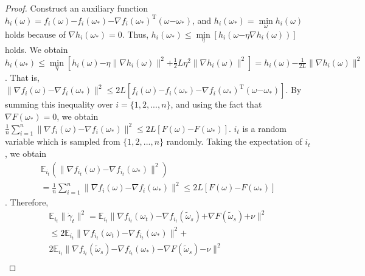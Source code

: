 \documentclass[letterpaper]{article}
\begin{document}
\begin{proof}
Construct an auxiliary function $h_i(\omega)=f_i(\omega)\mathrm{-}f_i(\omega_\ast)\mathrm{-}\nabla f_i(\omega_\ast)^\mathrm{T}(\omega\mathrm{-}\omega_\ast)$, and $h_i(\omega_\ast)=\min\limits_\omega h_i(\omega)$ holds because of $\nabla h_i(\omega_\ast)=0$. Thus, $h_i(\omega_\ast)\le \min\limits_\eta [h_i(\omega\mathrm{-}\eta \nabla h_i(\omega))]$ holds. We obtain
$h_i(\omega_\ast)\le\min\limits_\eta [h_i(\omega)\mathrm{-}\eta \parallel \nabla h_i(\omega) \parallel^2\mathrm{+}\frac{1}{2} L \eta^2 \parallel  \nabla h_i(\omega)  \parallel^2  ] 
=h_i(\omega)\mathrm{-}\frac{1}{2L}\parallel  \nabla h_i(\omega) \parallel^2$.  That is, 
$\parallel   \nabla f_i(\omega)  \mathrm{-} \nabla f_i(\omega_\ast)   \parallel^2 \le 2L [ f_i(\omega)  \mathrm{-}  f_i(\omega_\ast)  \mathrm{-}\nabla f_i(\omega_\ast)^{\mathrm{T}}(\omega\mathrm{-}\omega_\ast)  ]$. By summing this inequality over $i=\{1,2, ..., n\}$, and using the fact that $\nabla F(\omega_\ast)=0$, we obtain $
\frac{1}{n} \sum\limits_{i=1}^n \parallel  \nabla f_i(\omega)  \mathrm{-} \nabla f_i(\omega_\ast)  \parallel^2  \mathrm{\le}   2L [F(\omega)\mathrm{-}F(\omega_\ast)] $. $i_t$ is a random variable which is sampled from $\{1,2, ...,n\}$ randomly. Taking the expectation of $i_t$, we obtain 
\begin{equation}\label{equa_1}
\begin{array}{ll}
\mathbb{E}_{i_t}(\parallel  \nabla f_{i_{t}}(\omega) \mathrm{-} \nabla f_{i_{t}}(\omega_{\ast}) \parallel^2) \\
= \frac{1}{n} \sum\limits_{i=1}^n \parallel  \nabla f_i(\omega) \mathrm{-} \nabla f_i(\omega_\ast)  \parallel^2 \le 2L [F(\omega)\mathrm{-}F(\omega_\ast)] 
\end{array} 
\end{equation}.  Therefore,
\begin{equation}\label{equa_2}
\begin{array}{ll}
\mathbb{E}_{i_t}\parallel  \dot{\gamma}_{t} \parallel^2  
= \mathbb{E}_{i_t} \parallel \nabla f_{i_{t}}(\omega_{t}) \mathrm{-} \nabla f_{i_{t}}(\tilde{\omega}_s)  \mathrm{+} \nabla F(\tilde{\omega}_s) \mathrm{+} \nu \parallel^2\\
\le 2\mathbb{E}_{i_t} \parallel \nabla f_{i_{t}}(\omega_{t}) \mathrm{-} \nabla f_{i_{t}}(\omega_{\ast}) \parallel^2 \mathrm{+}\\
 2 \mathbb{E}_{i_t} \parallel  \nabla f_{i_{t}}(\tilde{\omega}_{s}) \mathrm{-} \nabla f_{i_{t}}(\omega_{\ast}) \mathrm{-} \nabla F(\tilde{\omega}_s)   \mathrm{-} \nu  \parallel^2  \\

\end{array}
\end{equation}
\end{proof}
\end{document}
